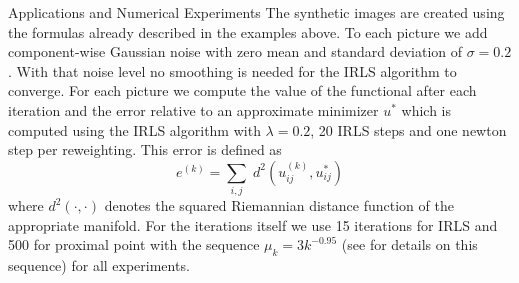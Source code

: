 \begin{chapter}{Applications and Numerical Experiments}
The synthetic images are created using the formulas already described in the examples above. To each picture we add component-wise Gaussian noise with zero mean and
standard deviation of $\sigma=0.2$. With that noise level no smoothing is needed for the IRLS algorithm to converge. 
For each picture we compute the value of the functional after each iteration and the error relative to an approximate minimizer $u^*$
which is computed using the IRLS algorithm with $\lambda=0.2$, 20 IRLS steps and one newton step per reweighting. This error is defined as
\begin{equation}
e^{(k)}=\sum_{i,j}\;d^2(u^{(k)}_{ij},u^*_{ij})
\end{equation}
where $d^2(\cdot,\cdot)$ denotes the squared Riemannian distance function of the appropriate manifold. For the iterations itself we use 15 iterations for IRLS and 500 for proximal point with
the sequence $\mu_k=3k^{-0.95}$ (see \cite{Weinmann} for details on this sequence) for all experiments. \\


\end{chapter}
